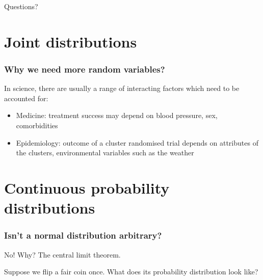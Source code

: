 \documentclass{beamer}
\begin{document}
	\begin{frame}
		\Large Questions?
	\end{frame}

	\section{Joint distributions}
	\frame{\tableofcontents[currentsection]}
	
	\begin{frame}
		\frametitle{Why we need more random variables?}
		
		In science, there are usually a range of interacting factors which need to be accounted for:
		
		\begin{itemize}
			\item Medicine: treatment success may depend on blood pressure, sex, comorbidities
			\item Epidemiology: outcome of a cluster randomised trial depends on attributes of the clusters, environmental variables such as the weather
		\end{itemize}
		
	\end{frame}
	
	\section{Continuous probability distributions}
	\frame{\tableofcontents[currentsection]}
	
	\begin{frame}
		\frametitle{Isn't a normal distribution arbitrary?}
		
		No! Why? The central limit theorem. 
		
		\vspace{0.5cm}
		
		Suppose we flip a fair coin once. What does its probability distribution look like?
		
	\end{frame}
	
\end{document}
